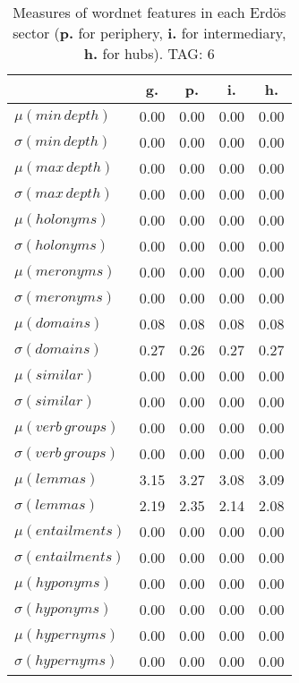 \begin{table}[h!]
\begin{center}
\begin{tabular}{| l | c | c | c | c |}\hline
 & g. & p. & i. & h. \\\hline
$\mu(min\,depth)$ & 0.00  & 0.00  & 0.00  & 0.00 \\\hline
$\sigma(min\,depth)$ & 0.00  & 0.00  & 0.00  & 0.00 \\\hline
$\mu(max\,depth)$ & 0.00  & 0.00  & 0.00  & 0.00 \\\hline
$\sigma(max\,depth)$ & 0.00  & 0.00  & 0.00  & 0.00 \\\hline
$\mu(holonyms)$ & 0.00  & 0.00  & 0.00  & 0.00 \\\hline
$\sigma(holonyms)$ & 0.00  & 0.00  & 0.00  & 0.00 \\\hline
$\mu(meronyms)$ & 0.00  & 0.00  & 0.00  & 0.00 \\\hline
$\sigma(meronyms)$ & 0.00  & 0.00  & 0.00  & 0.00 \\\hline
$\mu(domains)$ & 0.08  & 0.08  & 0.08  & 0.08 \\\hline
$\sigma(domains)$ & 0.27  & 0.26  & 0.27  & 0.27 \\\hline
$\mu(similar)$ & 0.00  & 0.00  & 0.00  & 0.00 \\\hline
$\sigma(similar)$ & 0.00  & 0.00  & 0.00  & 0.00 \\\hline
$\mu(verb\,groups)$ & 0.00  & 0.00  & 0.00  & 0.00 \\\hline
$\sigma(verb\,groups)$ & 0.00  & 0.00  & 0.00  & 0.00 \\\hline
$\mu(lemmas)$ & 3.15  & 3.27  & 3.08  & 3.09 \\\hline
$\sigma(lemmas)$ & 2.19  & 2.35  & 2.14  & 2.08 \\\hline
$\mu(entailments)$ & 0.00  & 0.00  & 0.00  & 0.00 \\\hline
$\sigma(entailments)$ & 0.00  & 0.00  & 0.00  & 0.00 \\\hline
$\mu(hyponyms)$ & 0.00  & 0.00  & 0.00  & 0.00 \\\hline
$\sigma(hyponyms)$ & 0.00  & 0.00  & 0.00  & 0.00 \\\hline
$\mu(hypernyms)$ & 0.00  & 0.00  & 0.00  & 0.00 \\\hline
$\sigma(hypernyms)$ & 0.00  & 0.00  & 0.00  & 0.00 \\\hline
\end{tabular}
\caption{Measures of wordnet features in each Erd\"os sector ({{\bf p.}} for periphery, {{\bf i.}} for intermediary, {{\bf h.}} for hubs). TAG: 6}
\end{center}
\end{table}